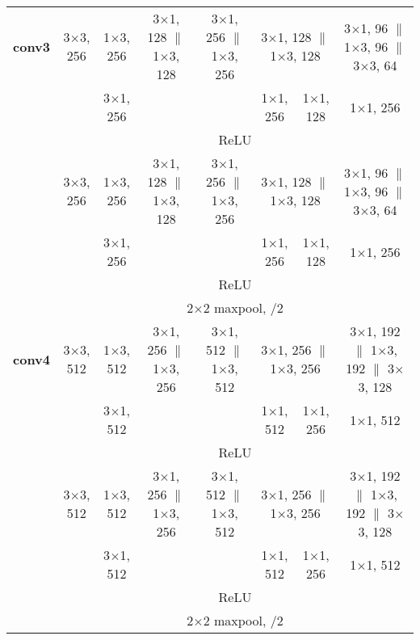 \documentclass[thesis]{subfiles}
\begin{document}
{\begin{landscape}
{\begin{table*}[p]
\begin{tabular}{@{}|c||c|c|c|c|c|c|c|c|@{}}
	\hline
	\textbf{conv3} & \multicolumn{2}{c|}{3$\times$3, 256} & 1$\times$3, 256 & 3$\times$1, 128 $\|$ 1$\times$3, 128 & 3$\times$1, 256 $\|$ 1$\times$3, 256 & \multicolumn{2}{c|}{3$\times$1, 128 $\|$ 1$\times$3, 128} & 3$\times$1, 96 $\|$ 1$\times$3, 96 $\|$ 3$\times$3, 64 \\
	\cline{4-4} \cline{7-9}
    & \multicolumn{2}{c|}{} & 3$\times$1, 256 & & & 1$\times$1, 256 & 1$\times$1, 128 & 1$\times$1, 256\\
    \cline{2-9}
	& \multicolumn{8}{c|}{ReLU}\\
    \cline{2-9}
	& \multicolumn{2}{c|}{3$\times$3, 256} & 1$\times$3, 256 & 3$\times$1, 128 $\|$ 1$\times$3, 128 & 3$\times$1, 256 $\|$ 1$\times$3, 256 &\multicolumn{2}{c|}{3$\times$1, 128 $\|$ 1$\times$3, 128} & 3$\times$1, 96 $\|$ 1$\times$3, 96 $\|$ 3$\times$3, 64 \\
	\cline{4-4} \cline{7-9}	
	& \multicolumn{2}{c|}{} & 3$\times$1, 256 & & & 1$\times$1, 256 & 1$\times$1, 128 & 1$\times$1, 256\\
    \cline{2-9}
	& \multicolumn{8}{c|}{ReLU}\\
    \cline{2-9}
	& \multicolumn{8}{c|}{2$\times$2 maxpool, /2}\\
	\hline
	\textbf{conv4} & \multicolumn{2}{c|}{3$\times$3, 512} & 1$\times$3, 512 & 3$\times$1, 256 $\|$ 1$\times$3, 256 & 3$\times$1, 512 $\|$ 1$\times$3, 512 &\multicolumn{2}{c|}{3$\times$1, 256 $\|$ 1$\times$3, 256} & 3$\times$1, 192 $\|$ 1$\times$3, 192 $\|$ 3$\times$3, 128\\
	\cline{4-4} \cline{7-9}
	& \multicolumn{2}{c|}{} & 3$\times$1, 512 & & & 1$\times$1, 512 & 1$\times$1, 256 & 1$\times$1, 512\\
    \cline{2-9}
	& \multicolumn{8}{c|}{ReLU}\\
    \cline{2-9}
	& \multicolumn{2}{c|}{3$\times$3, 512} & 1$\times$3, 512 & 3$\times$1, 256 $\|$ 1$\times$3, 256 & 3$\times$1, 512 $\|$ 1$\times$3, 512 & \multicolumn{2}{c|}{3$\times$1, 256 $\|$ 1$\times$3, 256} & 3$\times$1, 192 $\|$ 1$\times$3, 192 $\|$ 3$\times$3, 128\\
	\cline{4-4} \cline{7-9}
	& \multicolumn{2}{c|}{} & 3$\times$1, 512 & & & 1$\times$1, 512 & 1$\times$1, 256 & 1$\times$1, 512\\
    \cline{2-9}
	& \multicolumn{8}{c|}{ReLU}\\
    \cline{2-9}
	& \multicolumn{8}{c|}{2$\times$2 maxpool, /2}\\
	\hline

\end{tabular}
\end{table*}}
\end{landscape}}
\end{document}
